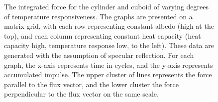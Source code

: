 \begin{description}
\begin{figure}[!ht]
\begin{minipage}[t]{200mm}
     \end{minipage}
     \caption{The integrated force for the cylinder and cuboid of varying
     degrees of temperature responsiveness.  The graphs are presented on a
     matrix grid, with each row representing constant albedo (high at the
     top), and each column representing constant heat capacity (heat capacity
     high, temperature response low, to the left).  These data are generated
     with the assumption of specular reflection.  For each graph, the x-axis represents time in cycles, and the y-axis represents accumulated impulse.  The upper cluster of lines
     represents the force parallel to the flux vector, and the lower cluster
     the force perpendicular to the flux vector on the same scale.}
     \label{fig:ivv_platemod_impulse}
     \end{figure}


\end{description}
